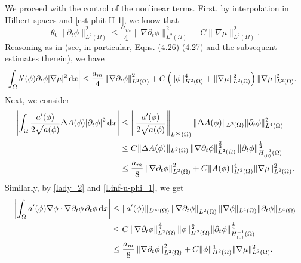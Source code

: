 \documentclass[11pt,reqno]{amsart}
\theoremstyle{remark}
\newcommand \norm[1] {\left\Vert #1\right\Vert}
\def\d{{\rm d}}
\numberwithin{equation}{section}
\def\d{{\rm d}}
\begin{document}
We proceed with the control of the nonlinear terms.
First, by interpolation in Hilbert spaces and \eqref{est-phit-H-1}, we know that
$$
\theta_0 \|\partial_t \phi \|_{L^2(\Omega)}^2 \leq \frac{a_m}{4} \| \nabla \partial_t \phi\|_{L^2(\Omega)}^2 +
C \| \nabla \mu\|_{L^2(\Omega)}^2.
$$
Reasoning as in \cite{CGGG2025} (see, in particular, Eqns. (4.26)-(4.27) and the subsequent estimates therein), we have
\begin{equation}\label{third_method}
\begin{split}
\left| \int_{\Omega} b'(\phi )\partial_t \phi |\nabla \mu |^2 \, \d x\right|
&\leq \frac{a_m}{4} \norm{\nabla \partial_t \phi}_{L^2(\Omega)}^2 +
 C\left(  \| \phi\|_{H^2(\Omega)}^4 + \| \nabla \mu\|_{L^2(\Omega)}^2
 \right) \| \nabla \mu\|_{L^2(\Omega)}^2.
\end{split}
\end{equation}
Next, we consider
\begin{align*}
\left| \int_\Omega \frac{a'(\phi)}{2\sqrt{a(\phi)}} \Delta A(\phi) |\partial_t \phi|^2 \, \d x \right|
&
\leq \left\| \frac{a'(\phi)}{2\sqrt{a(\phi)}} \right\|_{L^\infty(\Omega)} \| \Delta A(\phi)\|_{L^2(\Omega)} \| \partial_t \phi\|_{L^4(\Omega)}^2
\\
&\leq
C \| \Delta A(\phi)\|_{L^2(\Omega)}  \norm{\nabla \partial_t \phi}_{L^2(\Omega)}^\frac32
\| \partial_t \phi\|_{H^{-1}_{(0)}(\Omega)}^\frac12
\\
&\leq
\frac{a_m}{8} \norm{\nabla \partial_t \phi}_{L^2(\Omega)}^2 +
C \| A(\phi)\|_{H^2(\Omega)}^4  \| \nabla \mu\|_{L^2(\Omega)}^2.
\end{align*}
Similarly, by \eqref{lady_2} and \eqref{Linf-u-phi_1}, we get
\begin{align*}
\left|  \int_\Omega a'(\phi) \nabla \phi \cdot \nabla \partial_t \phi \, \partial_t \phi \, \d x  \right|
&\leq
\| a'(\phi)\|_{L^\infty(\Omega)} \norm{\nabla \partial_t \phi}_{L^2(\Omega)} \| \nabla \phi\|_{L^4(\Omega)}
\| \partial_t \phi\|_{L^4(\Omega)}
\\
&\leq
C   \norm{\nabla \partial_t \phi}_{L^2(\Omega)}^\frac74
\| \phi\|_{H^2(\Omega)}^\frac12
\| \partial_t \phi\|_{H^{-1}_{(0)}(\Omega)}^\frac14
\\
&
\leq
\frac{a_m}{8} \norm{\nabla \partial_t \phi}_{L^2(\Omega)}^2 +
C \| \phi\|_{H^2(\Omega)}^4  \| \nabla \mu\|_{L^2(\Omega)}^2.
\end{align*}
\end{document}
